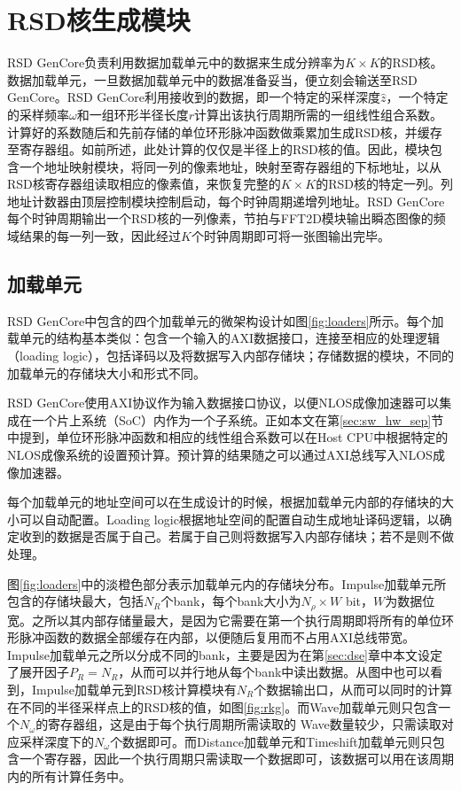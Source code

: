 \documentclass[master]{shtthesis}             %
\begin{document}
\section{RSD核生成模块}\label{sec:rsdgencore}

RSD GenCore负责利用数据加载单元中的数据来生成分辨率为$K\times K$的RSD核。数据加载单元，一旦数据加载单元中的数据准备妥当，便立刻会输送至RSD GenCore。RSD GenCore利用接收到的数据，即一个特定的采样深度$\hat{z}$，一个特定的采样频率$\omega$和一组环形半径长度$r$计算出该执行周期所需的一组线性组合系数。计算好的系数随后和先前存储的单位环形脉冲函数做乘累加生成RSD核，并缓存至寄存器组。如前所述，此处计算的仅仅是半径上的RSD核的值。因此，模块包含一个地址映射模块，将同一列的像素地址，映射至寄存器组的下标地址，以从RSD核寄存器组读取相应的像素值，来恢复完整的$K\times K$的RSD核的特定一列。列地址计数器由顶层控制模块控制启动，每个时钟周期递增列地址。RSD GenCore每个时钟周期输出一个RSD核的一列像素，节拍与FFT2D模块输出瞬态图像的频域结果的每一列一致，因此经过$K$个时钟周期即可将一张图输出完毕。

\subsection{加载单元}

RSD GenCore中包含的四个加载单元的微架构设计如图\ref{fig:loaders}所示。每个加载单元的结构基本类似：包含一个输入的AXI数据接口，连接至相应的处理逻辑（loading logic），包括译码以及将数据写入内部存储块；存储数据的模块，不同的加载单元的存储块大小和形式不同。

RSD GenCore使用AXI协议作为输入数据接口协议，以便NLOS成像加速器可以集成在一个片上系统（SoC）内作为一个子系统。正如本文在第\ref{sec:sw_hw_sep}节中提到，单位环形脉冲函数和相应的线性组合系数可以在Host CPU中根据特定的NLOS成像系统的设置预计算。预计算的结果随之可以通过AXI总线写入NLOS成像加速器。

每个加载单元的地址空间可以在生成设计的时候，根据加载单元内部的存储块的大小可以自动配置。Loading logic根据地址空间的配置自动生成地址译码逻辑，以确定收到的数据是否属于自己。若属于自己则将数据写入内部存储块；若不是则不做处理。

图\ref{fig:loaders}中的淡橙色部分表示加载单元内的存储块分布。Impulse加载单元所包含的存储块最大，包括$N_R$个bank，每个bank大小为$N_\rho\times W$ bit，$W$为数据位宽。之所以其内部存储量最大，是因为它需要在第一个执行周期即将所有的单位环形脉冲函数的数据全部缓存在内部，以便随后复用而不占用AXI总线带宽。Impulse加载单元之所以分成不同的bank，主要是因为在第\ref{sec:dse}章中本文设定了展开因子$P_R=N_R$，从而可以并行地从每个bank中读出数据。从图中也可以看到，Impulse加载单元到RSD核计算模块有$N_R$个数据输出口，从而可以同时的计算在不同的半径采样点上的RSD核的值，如图\ref{fig:rkg}。而Wave加载单元则只包含一个$N_\omega$的寄存器组，这是由于每个执行周期所需读取的 Wave数量较少，只需读取对应采样深度下的$N_\omega$个数据即可。而Distance加载单元和Timeshift加载单元则只包含一个寄存器，因此一个执行周期只需读取一个数据即可，该数据可以用在该周期内的所有计算任务中。
\end{document}
